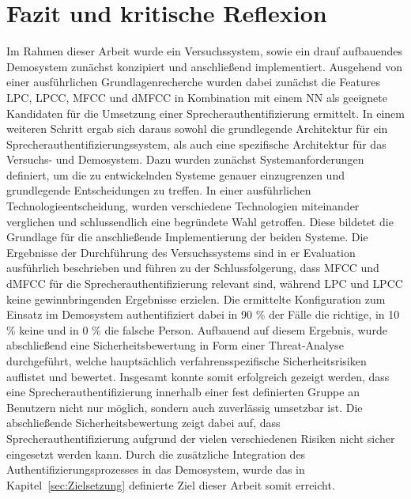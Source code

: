 \section{Fazit und kritische Reflexion}
Im Rahmen dieser Arbeit wurde ein Versuchssystem, sowie ein drauf aufbauendes Demosystem zunächst konzipiert und anschließend implementiert.
Ausgehend von einer ausführlichen Grundlagenrecherche wurden dabei zunächst die Features \ac{LPC}, \ac{LPCC}, \ac{MFCC} und \ac{dMFCC} in Kombination mit einem \ac{NN} als geeignete Kandidaten für die Umsetzung einer Sprecherauthentifizierung ermittelt.
In einem weiteren Schritt ergab sich daraus sowohl die grundlegende Architektur für ein Sprecherauthentifizierungssystem, als auch eine spezifische Architektur für das Versuchs- und Demosystem.
Dazu wurden zunächst Systemanforderungen definiert, um die zu entwickelnden Systeme genauer einzugrenzen und grundlegende Entscheidungen zu treffen.
In einer ausführlichen Technologieentscheidung, wurden verschiedene Technologien miteinander verglichen und schlussendlich eine begründete Wahl getroffen.
Diese bildetet die Grundlage für die anschließende Implementierung der beiden Systeme.
Die Ergebnisse der Durchführung des Versuchssystems sind in er Evaluation ausführlich beschrieben und führen zu der Schlussfolgerung, dass \ac{MFCC} und \ac{dMFCC} für die Sprecherauthentifizierung relevant sind, während \ac{LPC} und \ac{LPCC} keine gewinnbringenden Ergebnisse erzielen.
Die ermittelte Konfiguration zum Einsatz im Demosystem authentifiziert dabei in 90 \% der Fälle die richtige, in 10 \% keine und in 0 \% die falsche Person.
Aufbauend auf diesem Ergebnis, wurde abschließend eine Sicherheitsbewertung in Form einer Threat-Analyse durchgeführt, welche hauptsächlich verfahrensspezifische Sicherheitsrisiken auflistet und bewertet.
Insgesamt konnte somit erfolgreich gezeigt werden, dass eine Sprecherauthentifizierung innerhalb einer fest definierten Gruppe an Benutzern nicht nur möglich, sondern auch zuverlässig umsetzbar ist.
Die abschließende Sicherheitsbewertung zeigt dabei auf, dass Sprecherauthentifizierung aufgrund der vielen verschiedenen Risiken nicht sicher eingesetzt werden kann.
Durch die zusätzliche Integration des Authentifizierungsprozesses in das Demosystem, wurde das in Kapitel~\ref{sec:Zielsetzung} definierte Ziel dieser Arbeit somit erreicht.

